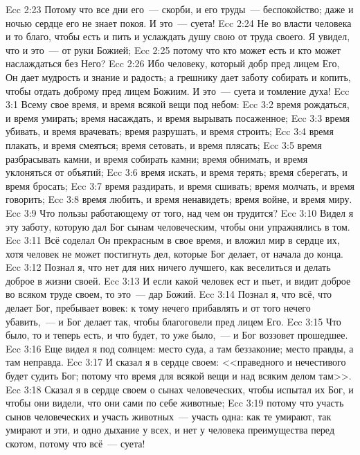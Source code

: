 \vs Ecc 2:23 Потому что все дни его~--- скорби, и его труды~--- беспокойство; даже и ночью сердце его не знает покоя. И это~--- суета!
\rsbpar\vs Ecc 2:24 Не во власти человека и то благо, чтобы есть и пить и услаждать душу свою от труда своего. Я увидел, что и это~--- от руки Божией;
\vs Ecc 2:25 потому что кто может есть и кто может наслаждаться без Него?
\vs Ecc 2:26 Ибо человеку, который добр пред лицем Его, Он дает мудрость и знание и радость; а грешнику дает заботу собирать и копить, чтобы  отдать доброму пред лицем Божиим. И это~--- суета и томление духа!
\vs Ecc 3:1 Всему свое время, и время всякой вещи под небом:
\vs Ecc 3:2 время рождаться, и время умирать; время насаждать, и время вырывать посаженное;
\vs Ecc 3:3 время убивать, и время врачевать; время разрушать, и время строить;
\vs Ecc 3:4 время плакать, и время смеяться; время сетовать, и время плясать;
\vs Ecc 3:5 время разбрасывать камни, и время собирать камни; время обнимать, и время уклоняться от объятий;
\vs Ecc 3:6 время искать, и время терять; время сберегать, и время бросать;
\vs Ecc 3:7 время раздирать, и время сшивать; время молчать, и время говорить;
\vs Ecc 3:8 время любить, и время ненавидеть; время войне, и время миру.
\rsbpar\vs Ecc 3:9 Что пользы работающему от того, над чем он трудится?
\vs Ecc 3:10 Видел я эту заботу, которую дал Бог сынам человеческим, чтобы они упражнялись в том.
\vs Ecc 3:11 Всё соделал Он прекрасным в свое время, и вложил мир в сердце их, хотя человек не может постигнуть дел, которые Бог делает, от начала до конца.
\vs Ecc 3:12 Познал я, что нет для них ничего лучшего, как веселиться и делать доброе в жизни своей.
\vs Ecc 3:13 И если какой человек ест и пьет, и видит доброе во всяком труде своем, то это~--- дар Божий.
\vs Ecc 3:14 Познал я, что всё, что делает Бог, пребывает вовек: к тому нечего прибавлять и от того нечего убавить,~--- и Бог делает так, чтобы благоговели пред лицем Его.
\vs Ecc 3:15 Что было, то и теперь есть, и что будет, то уже было,~--- и Бог воззовет прошедшее.
\rsbpar\vs Ecc 3:16 Еще видел я под солнцем: место суда, а там беззаконие; место правды, а там неправда.
\vs Ecc 3:17 И сказал я в сердце своем: <<праведного и нечестивого будет судить Бог; потому что время для всякой вещи и  над всяким делом там>>.
\rsbpar\vs Ecc 3:18 Сказал я в сердце своем о сынах человеческих, чтобы испытал их Бог, и чтобы они видели, что они сами по себе животные;
\vs Ecc 3:19 потому что участь сынов человеческих и участь животных~--- участь одна: как те умирают, так умирают и эти, и одно дыхание у всех, и нет у человека преимущества перед скотом, потому что всё~--- суета!
